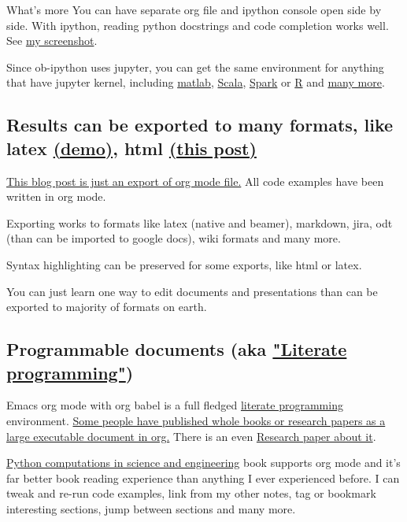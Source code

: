 \documentclass[11pt]{article}
\begin{document}
What's more You can have separate org file and ipython console open side by side.
With ipython, reading python docstrings and code completion works well. See \hyperref[sec:orgheadline2]{my screenshot}.

Since ob-ipython uses jupyter, you can get the same environment for anything that have jupyter kernel, including \href{https://github.com/calysto/matlab_kernel}{matlab}, \href{https://github.com/alexarchambault/jupyter-scala}{Scala}, \href{https://github.com/apache/incubator-toree}{Spark} or \href{http://irkernel.github.io/}{R} and \href{https://github.com/ipython/ipython/wiki/IPython-kernels-for-other-languages}{many more}.
\subsection{Results can be exported to many formats, like latex \href{https://github.com/kozikow/kozikow-blog/blob/master/ob_ipython/ipython.pdf}{(demo)}, html \href{https://kozikow.wordpress.com/2016/05/22/very-powerful-data-analysis-environment-org-mode-with-ob-ipython/}{(this post)}}
\label{sec:orgheadline4}
\href{https://github.com/kozikow/kozikow-blog/blob/master/ob_ipython/ipython.org}{This blog post is just an export of org mode file.} All code examples have been written in org mode.

Exporting works to formats like latex (native and beamer), markdown, jira, odt (than can be imported to google docs), wiki formats and many more.

Syntax highlighting can be preserved for some exports, like html or latex.

You can just learn one way to edit documents and presentations than can be exported to majority of formats on earth.
\subsection{Programmable documents (aka \href{https://en.wikipedia.org/wiki/Literate_programming}{"Literate programming"})}
\label{sec:orgheadline5}
Emacs org mode with org babel is a full fledged \href{https://en.wikipedia.org/wiki/Literate_programming}{literate programming} environment.
\href{http://kitchingroup.cheme.cmu.edu/blog/2014/08/08/What-we-are-using-org-mode-for/}{Some people have published whole books or research papers as a large executable document in org.} There is an even \href{http://dl.acm.org/citation.cfm?id=2723881}{Research paper about it}.

\href{https://github.com/jkitchin/pycse}{Python computations in science and engineering} book supports org mode and
it's far better book reading experience than anything I ever experienced before.
I can tweak and re-run code examples, link from my other notes, tag or bookmark interesting
sections, jump between sections and many more.
\end{document}
